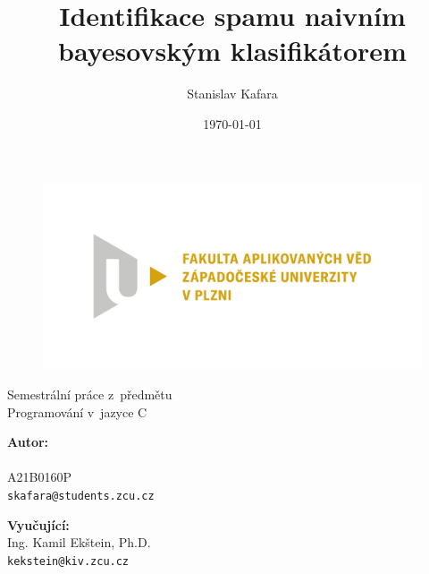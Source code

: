\documentclass[a4paper, 12pt]{report}
\title{Identifikace spamu naivním bayesovským klasifikátorem}
\author{Stanislav Kafara}
\date{\today}
\begin{document}
\begin{titlepage}

\begin{center}

\begin{figure}
\centering
\includegraphics[width=.75\textwidth]{FAV_logo}
\end{figure}

\vspace{4\baselineskip}

Semestrální práce z~předmětu\\
Programování v~jazyce C

\vspace{2\baselineskip}

{\makeatletter
\LARGE \bfseries \@title
\makeatother}

\end{center}

\vfill

\begin{flushleft}

\textbf{Autor:}\\
{\makeatletter
\@author
\makeatother}\\
A21B0160P\\
\texttt{skafara@students.zcu.cz}

\vspace{\baselineskip}

\textbf{Vyučující:}\\
Ing. Kamil Ekštein, Ph.D.\\
\texttt{kekstein@kiv.zcu.cz}

\end{flushleft}

\end{titlepage}

\begin{tableofcontents}

\end{tableofcontents}
\end{document}
